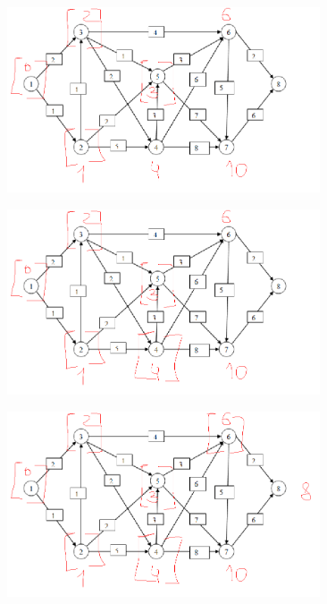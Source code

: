 \documentclass[12pt]{article}
\begin{document}
\begin{center}
\includegraphics[width=350]{14_4.png}
\end{center}
\begin{center}
\includegraphics[width=350]{14_5.png}
\end{center}
\begin{center}
\includegraphics[width=350]{14_6.png}
\end{center}
\end{document}
